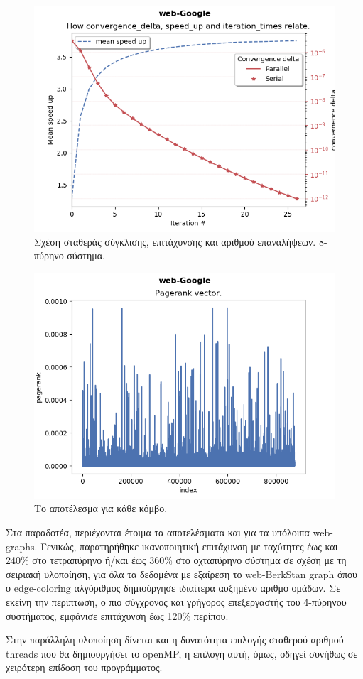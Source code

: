\begin{center}
\begin{figure}
\includegraphics[width=\linewidth]{plots/speed_up_diades.png}
\caption{Σχέση σταθεράς σύγκλισης, επιτάχυνσης και αριθμού επαναλήψεων. 8-πύρηνο σύστημα.}
\end{figure}

\begin{figure}
\includegraphics[width=\linewidth]{plots/pagerank.png}
\caption{Το αποτέλεσμα για κάθε κόμβο.}
\end{figure}

\end{center}


Στα παραδοτέα, περιέχονται έτοιμα τα αποτελέσματα και για τα υπόλοιπα web-graphs. Γενικώς, παρατηρήθηκε ικανοποιητική επιτάχυνση με ταχύτητες έως και 240\% στο τετραπύρηνο ή/και έως 360\% στο οχταπύρηνο σύστημα σε σχέση με τη σειριακή υλοποίηση, για όλα τα δεδομένα με εξαίρεση το web-BerkStan graph όπου ο edge-coloring αλγόριθμος δημιούργησε ιδιαίτερα αυξημένο αριθμό ομάδων. Σε εκείνη την περίπτωση, ο πιο σύγχρονος και γρήγορος επεξεργαστής του 4-πύρηνου συστήματος, εμφάνισε επιτάχυνση έως 120\% περίπου.

Στην παράλληλη υλοποίηση δίνεται και η δυνατότητα επιλογής σταθερού αριθμού threads που θα δημιουργήσει το openMP, η επιλογή αυτή, όμως, οδηγεί συνήθως σε χειρότερη επίδοση του προγράμματος.



